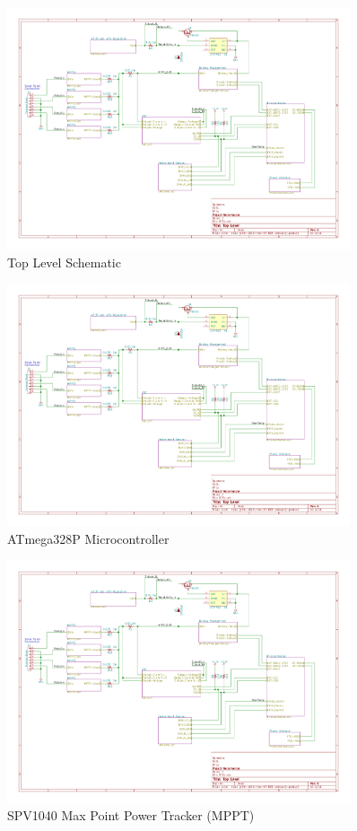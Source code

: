 \documentclass{article}
\numberwithin{figure}{section}
\numberwithin{equation}{section}
\begin{document}
{\begin{figure}[H]
	\centering
	\includegraphics[page=1,width=0.9\textwidth]{RFCxSchematics.pdf}
	\caption{Top Level Schematic}
	\label{fig:schemp1}
\end{figure}

\begin{figure}[H]
	\centering
	\includegraphics[page=2,width=0.9\textwidth]{RFCxSchematics.pdf}
	\caption{ATmega328P Microcontroller}
	\label{fig:schemp2}
\end{figure}

\begin{figure}[H]
	\centering
	\includegraphics[page=3,width=0.9\textwidth]{RFCxSchematics.pdf}
	\caption{SPV1040 Max Point Power Tracker (MPPT)}
	\label{fig:schemp3}
\end{figure}

}
\end{document}
